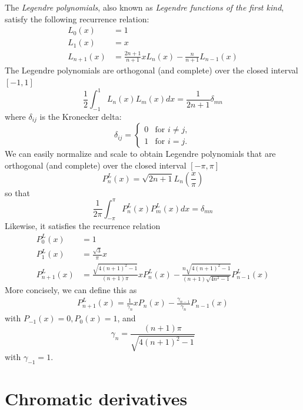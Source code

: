 \documentclass[11pt,oneside]{book}
\theoremstyle{plain}
\theoremstyle{definition}
\theoremstyle{remark}
\begin{document}
The \emph{Legendre polynomials}, also known as \emph{Legendre functions of the 
first kind}, satisfy the following recurrence relation:
\begin{align}
L_0(x)     &= 1 \\
L_1(x)     &= x \\
L_{n+1}(x) &= \frac{2n+1}{n+1} x L_n(x) - \frac{n}{n+1} L_{n-1}(x)
\end{align}
The Legendre polynomials are orthogonal (and complete) over the closed interval 
$[-1, 1]$
\begin{equation*}
  \frac{1}{2}\int_{-1}^{1} L_n(x)L_m(x) dx = \frac{1}{2n+1} \delta_{mn}
\end{equation*}
where $\delta_{ij}$ is the Kronecker delta:
\begin{equation}
  \delta_{ij} =
    \begin{cases}
     0       & \text{for } i \neq j, \\
     1       & \text{for } i = j.
    \end{cases}
\end{equation}
We can easily normalize and scale to obtain Legendre polynomials that are
orthogonal (and complete) over the closed interval $[-\pi,\pi]$
\begin{equation}
  P_n^L(x) = \sqrt{2n+1}L_n\left(\frac{x}{\pi}\right)
\end{equation}
so that 
\begin{equation*}
\frac{1}{2\pi} \int_{-\pi}^{\pi} P_n^L(x)P_m^L(x) dx = \delta_{mn}
\end{equation*}
Likewise, it satisfies the recurrence relation
\begin{align}
P_0^L(x)     &= 1 \\
P_1^L(x)     &= \frac{\sqrt{3}}{\pi} x \\
P_{n+1}^L(x) &= \frac{\sqrt{4(n+1)^2-1}}{(n+1) \pi} x P_n^L(x) - \frac{n\sqrt{4(n+1)^2-1}}{(n+1)\sqrt{4n^2-1}} P_{n-1}^L(x)
\end{align}
More concisely, we can define this as
\begin{align}
  P_{n+1}^L(x) = \frac{1}{\gamma_n} x P_n(x) - \frac{\gamma_{n-1}}{\gamma_n} P_{n-1}(x)
\end{align}
with $P_{-1}(x)=0, P_0(x)=1$, and
\begin{equation}
  \gamma_n = \frac{(n+1) \pi}{\sqrt{4(n+1)^2-1}}
\end{equation}
with $\gamma_{-1} = 1$.

\section{Chromatic derivatives}
\end{document}
